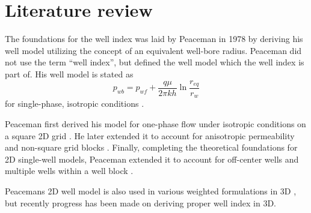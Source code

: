 
\section{Literature review} %
\label{sec:literature_review}
The foundations for the well index was laid by Peaceman in 1978 \cite{Aavatsmark2003Well} by deriving his well model utilizing the concept of an equivalent well-bore radius. Peaceman did not use the term ``well index'', but defined the well model which the well index is part of. His well model is stated as
\begin{equation}
    \label{eq:review-model}
    p_{wb} = p_{wf} + \frac{q\mu}{2\pi kh} \ln \frac{r_{eq}}{r_w}
\end{equation}
for single-phase, isotropic conditions \cite{Peaceman1978Interpretation}.

Peaceman first derived his model for one-phase flow under isotropic conditions on a square 2D grid \cite{Peaceman1978Interpretation}. He later extended it to account for anisotropic permeability and non-square grid blocks \cite{Peaceman1983Interpretation}. Finally, completing the theoretical foundations for 2D single-well models, Peaceman extended it to account for off-center wells and multiple wells within a well block \cite{Peaceman1990Interpretation}.

Peacemans 2D well model is also used in various weighted formulations in 3D \cite{Aavatsmark2003Well}, but recently progress has been made on deriving proper well index in 3D.


